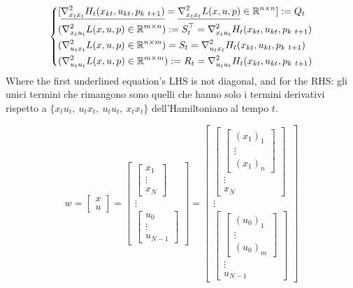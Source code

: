 \[
	\left\{
	\begin{aligned}
	&[\underline{\nabla^2_{x_tx_t}{H_t(x_{kt},u_{kt},p_{k\ t+1})}} = \underline{\nabla^2_{x_tx_t}{L(x,u,p)}}\in\mathbb{R}^{n\times n}] := Q_t\\
	&(\nabla^2_{x_tu_t}{L(x,u,p)}\in\mathbb{R}^{m\times n}) := S_t^\top = \nabla^2_{x_tu_t}{H_t(x_{kt},u_{kt},p_{k\ t+1})}\\
	&(\nabla^2_{u_tx_t}{L(x,u,p)}\in\mathbb{R}^{n\times m}) = S_t = \nabla^2_{u_tx_t}{H_t(x_{kt},u_{kt},p_{k\ t+1})}\\
	&(\nabla^2_{u_tu_t}{L(x,u,p)}\in\mathbb{R}^{m\times m}) := R_t = \nabla^2_{u_tu_t}{H_t(x_{kt},u_{kt},p_{k\ t+1})}
	\end{aligned}
	\right.
\]
Where the first underlined equation's LHS is not diagonal, and for the RHS: gli unici termini che rimangono sono quelli che hanno solo i termini derivativi rispetto a $\{x_tu_t,\ u_tx_t,\ u_tu_t,\ x_tx_t\}$ dell'Hamiltoniano al tempo $t$.

\[
	w = \begin{bmatrix}x\\u\end{bmatrix} = \begin{bmatrix}\begin{bmatrix}x_1\\ \vdots\\x_N\end{bmatrix}\\ \vdots\\ \begin{bmatrix}u_0\\ \vdots\\u_{N-1}\end{bmatrix}\end{bmatrix} = \begin{bmatrix}\begin{bmatrix}\begin{bmatrix}(x_1)_1\\ \vdots\\ (x_1)_n\end{bmatrix}\\ \vdots\\ x_N\end{bmatrix}\\ \vdots\\ \begin{bmatrix}\begin{bmatrix}(u_0)_1\\ \vdots\\ (u_0)_m\end{bmatrix}\\ \vdots\\ u_{N-1}\end{bmatrix}\end{bmatrix}
\]

